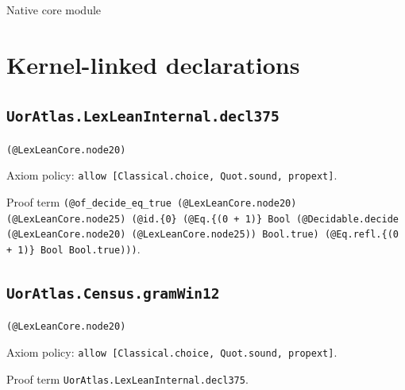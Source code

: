 \documentclass[11pt]{article}
\begin{document}
\begin{center}{\LARGE Native core module}\end{center}
\section*{Kernel-linked declarations}
\subsection*{\texttt{UorAtlas.LexLeanInternal.decl375}}
\noindent\texttt{(@LexLeanCore.node20)}\par
\noindent Axiom policy: \texttt{allow [Classical.choice, Quot.sound, propext]}.\par
\noindent Proof term \texttt{(@of\_decide\_eq\_true (@LexLeanCore.node20) (@LexLeanCore.node25) (@id.\{0\} (@Eq.\{(0 + 1)\} Bool (@Decidable.decide (@LexLeanCore.node20) (@LexLeanCore.node25)) Bool.true) (@Eq.refl.\{(0 + 1)\} Bool Bool.true)))}.\par
\subsection*{\texttt{UorAtlas.Census.gramWin12}}
\noindent\texttt{(@LexLeanCore.node20)}\par
\noindent Axiom policy: \texttt{allow [Classical.choice, Quot.sound, propext]}.\par
\noindent Proof term \texttt{UorAtlas.LexLeanInternal.decl375}.\par
\end{document}
